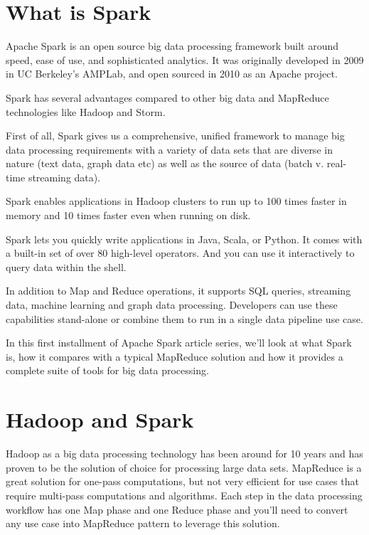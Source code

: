 \documentclass[a4paper,12pt]{article}
\begin{document}
\section*{What is Spark}

Apache Spark is an open source big data processing framework built around speed, ease of use, and sophisticated analytics. It was originally developed in 2009 in UC Berkeley’s AMPLab, and open sourced in 2010 as an Apache project.

Spark has several advantages compared to other big data and MapReduce technologies like Hadoop and Storm.

First of all, Spark gives us a comprehensive, unified framework to manage big data processing requirements with a variety of data sets that are diverse in nature (text data, graph data etc) as well as the source of data (batch v. real-time streaming data).

Spark enables applications in Hadoop clusters to run up to 100 times faster in memory and 10 times faster even when running on disk.

Spark lets you quickly write applications in Java, Scala, or Python. It comes with a built-in set of over 80 high-level operators. And you can use it interactively to query data within the shell.

In addition to Map and Reduce operations, it supports SQL queries, streaming data, machine learning and graph data processing. Developers can use these capabilities stand-alone or combine them to run in a single data pipeline use case.

In this first installment of Apache Spark article series, we'll look at what Spark is, how it compares with a typical MapReduce solution and how it provides a complete suite of tools for big data processing.

\section*{Hadoop and Spark}

Hadoop as a big data processing technology has been around for 10 years and has proven to be the solution of choice for processing large data sets. MapReduce is a great solution for one-pass computations, but not very efficient for use cases that require multi-pass computations and algorithms. Each step in the data processing workflow has one Map phase and one Reduce phase and you'll need to convert any use case into MapReduce pattern to leverage this solution.
\end{document}
